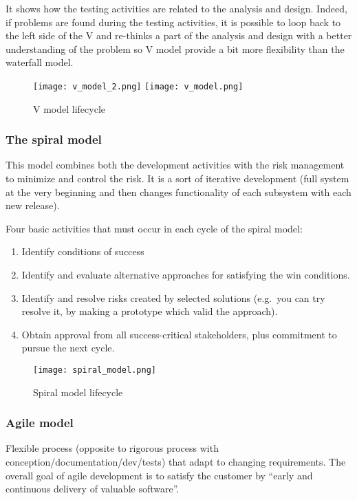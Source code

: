 It shows how the testing activities are related to the analysis and
design. Indeed, if problems are found during the testing activities, it
is possible to loop back to the left side of the V and re-thinks a part
of the analysis and design with a better understanding of the problem so
V model provide a bit more flexibility than the waterfall model.

\begin{figure}[!ht]
    \centering
    \texttt{[image: v\_model\_2.png]}
    \texttt{[image: v\_model.png]}
    \caption{V model lifecycle}
\end{figure}
\FloatBarrier{}

\subsubsection{The spiral model}

This model combines both the development activities with the risk management to minimize and
control the risk. It is a sort of iterative development (full system at the very
beginning and then changes functionality of each subsystem with each new
release).

Four basic activities that must occur in each cycle of the spiral model:

\begin{enumerate}
    \item Identify conditions of success
    \item Identify and evaluate alternative approaches for satisfying the win
    conditions.
    \item Identify and resolve risks created by selected solutions
    (e.g.\ you can try resolve it, by making a prototype which valid the
    approach).
    \item Obtain approval from all success-critical stakeholders, plus
    commitment to pursue the next cycle.
\end{enumerate}

\begin{figure}[!ht]
    \centering
    \texttt{[image: spiral\_model.png]}
    \caption{Spiral model lifecycle}
\end{figure}
\FloatBarrier{}

\subsubsection{Agile model}

Flexible process (opposite to rigorous process with
conception/documentation/dev/tests) that adapt to changing requirements.
The overall goal of agile development is
to satisfy the customer by \enquote{early and continuous delivery of
valuable software}.

